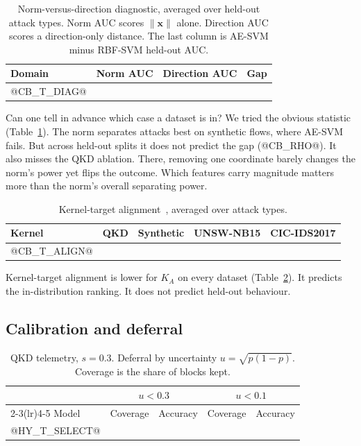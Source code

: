\documentclass[journal]{IEEEtran}
\begin{document}
\begin{table}[t]
  \centering
  \caption{Norm-versus-direction diagnostic, averaged over held-out attack types. Norm AUC scores $\|\mathbf{x}\|$ alone. Direction AUC scores a direction-only distance. The last column is AE-SVM minus RBF-SVM held-out AUC.}
  \label{tab:diag}
  \footnotesize
  \setlength{\tabcolsep}{3pt}
  \begin{tabular}{lccc}
    \toprule
    Domain & Norm AUC & Direction AUC & Gap \\
    \midrule
@CB_T_DIAG@
    \bottomrule
  \end{tabular}
\end{table}

Can one tell in advance which case a dataset is in? We tried the obvious
statistic (Table~\ref{tab:diag}). The norm separates attacks best on synthetic
flows, where AE-SVM fails. But across held-out splits it does not predict the
gap (@CB_RHO@). It also misses the QKD ablation. There, removing one coordinate
barely changes the norm's power yet flips the outcome. Which features carry
magnitude matters more than the norm's overall separating power.

\begin{table}[t]
  \centering
  \caption{Kernel-target alignment~\cite{cristianini2002kernel}, averaged over attack types.}
  \label{tab:align}
  \footnotesize
  \begin{tabular}{lcccc}
    \toprule
    Kernel & QKD & Synthetic & UNSW-NB15 & CIC-IDS2017 \\
    \midrule
@CB_T_ALIGN@
    \bottomrule
  \end{tabular}
\end{table}

Kernel-target alignment is lower for $K_A$ on every dataset (Table~\ref{tab:align}).
It predicts the in-distribution ranking. It does not predict held-out behaviour.

\subsection{Calibration and deferral}
\label{sec:res-calib}

\begin{table}[t]
  \centering
  \caption{QKD telemetry, $s=0.3$. Deferral by uncertainty $u=\sqrt{p(1-p)}$. Coverage is the share of blocks kept.}
  \label{tab:select}
  \footnotesize
  \setlength{\tabcolsep}{4pt}
  \begin{tabular}{lcccc}
    \toprule
    & \multicolumn{2}{c}{$u<0.3$} & \multicolumn{2}{c}{$u<0.1$} \\
    \cmidrule(lr){2-3}\cmidrule(lr){4-5}
    Model & Coverage & Accuracy & Coverage & Accuracy \\
    \midrule
@HY_T_SELECT@
    \bottomrule
  \end{tabular}
\end{table}
\end{document}
